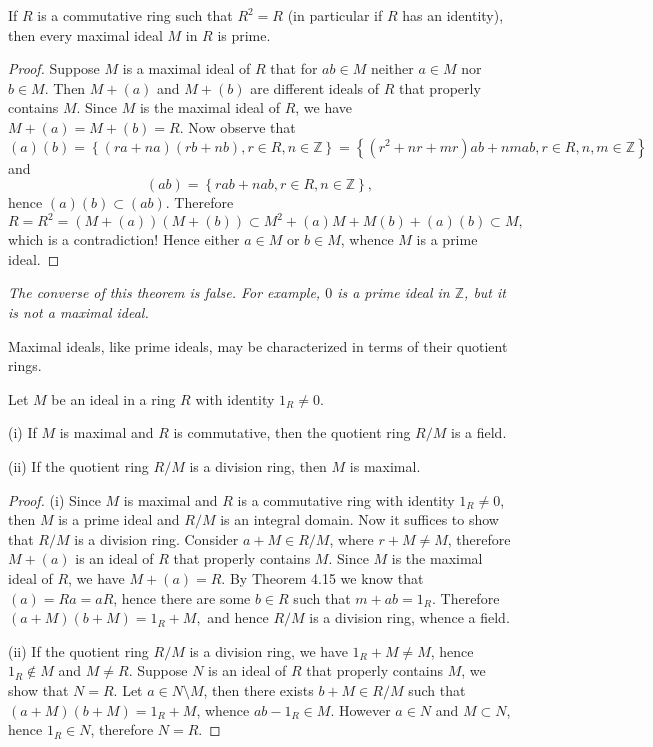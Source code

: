 \begin{theorem}
If $R$ is a commutative ring such that $R^2=R$ (in particular if $R$ has an identity), then every maximal ideal $M$ in $R$ is prime.
\end{theorem}
\begin{proof}
Suppose $M$ is a maximal ideal of $R$ that for $ab\in M$ neither $a\in M$ nor $b\in M$. Then $M+(a)$ and $M+(b)$ are different ideals of $R$ that properly contains $M$. Since $M$ is the maximal ideal of $R$, we have $M+(a)=M+(b)=R$. Now observe that 
$$
\left( a \right) \left( b \right) =\left\{ \left( ra+na \right) \left( rb+nb \right) ,r\in R,n\in \mathbb{Z} \right\} =\left\{ \left( r^2+nr+mr \right) ab+nmab,r\in R,n,m\in \mathbb{Z} \right\} 
$$
and 
$$
\left( ab \right) =\left\{ rab+nab,r\in R,n\in \mathbb{Z} \right\} ,
$$
hence $(a)(b)\subset(ab)$. Therefore 
$$
R=R^2=\left( M+\left( a \right) \right) \left( M+\left( b \right) \right) \subset M^2+\left( a \right) M+M\left( b \right) +\left( a \right) \left( b \right) \subset M,
$$
which is a contradiction! Hence either $a\in M$ or $b\in M$, whence $M$ is a prime ideal.
\end{proof}
\begin{note}\em
The converse of this theorem is false. For example, $0$ is a prime ideal in $\mathbb{Z}$, but it is not a maximal ideal.
\end{note}
Maximal ideals, like prime ideals, may be characterized in terms of their quotient rings.
\begin{theorem}
Let $M$ be an ideal in a ring $R$ with identity $1_R\ne 0$.\par
(i) If $M$ is maximal and $R$ is commutative, then the quotient ring $R/M$ is a field.\par
(ii) If the quotient ring $R/M$ is a division ring, then $M$ is maximal.
\end{theorem}
\begin{proof}
(i) Since $M$ is maximal and $R$ is a commutative ring with identity $1_R\ne 0$, then $M$ is a prime ideal and $R/M$ is an integral domain. Now it suffices to show that $R/M$ is a division ring. Consider $a+M\in R/M$, where $r+M\ne M$, therefore $M+(a)$ is an ideal of $R$ that properly contains $M$. Since $M$ is the maximal ideal of $R$, we have $M+(a)=R$. By Theorem 4.15 we know that $(a)=Ra=aR$, hence there are some $b\in R$ such that $m+ab=1_R$. Therefore $\left( a+M \right) \left( b+M \right) =1_R+M,$ and hence $R/M$ is a division ring, whence a field.\par
(ii) If the quotient ring $R/M$ is a division ring, we have $1_R+M\ne M$, hence $1_R\notin M$ and $M\ne R$. Suppose $N$ is an ideal of $R$ that properly contains $M$, we show that $N=R$. Let $a\in N\setminus M$, then there exists $b+M\in R/M$ such that $(a+M)(b+M)=1_R+M$, whence $ab-1_R\in M$. However $a\in N$ and $M\subset N$, hence $1_R\in N$, therefore $N=R$.
\end{proof}

